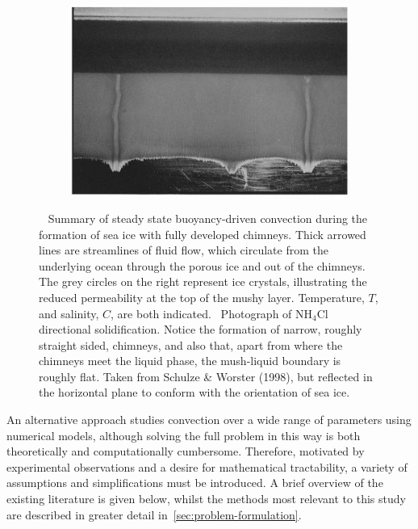 \documentclass[11pt]{proc}
\begin{document}
\begin{figure}[t]
\begin{subfigure}[t]{.55\linewidth}
    \label{subfig:convection-in-sea-ice}
\end{subfigure}
\quad
\captionsetup[subfigure]{ aboveskip=4pt}
\begin{subfigure}[t]{.36\linewidth}
   \centering
   \caption{}
    \includegraphics[width=0.9\linewidth, right]{mushy-layer-chimneys-photo-schulze-worster.jpg}
    
    \label{subfig:schulze-worster-photo}
\end{subfigure}

\caption{~ Summary of steady state buoyancy-driven convection during the formation of sea ice with fully developed chimneys. Thick arrowed lines are streamlines of fluid flow, which circulate from the underlying ocean through the porous ice and out of the chimneys. The grey circles on the right represent ice crystals, illustrating the reduced permeability at the top of the mushy layer. Temperature, $T$, and salinity, $C$, are both indicated.~ Photograph of $\textrm{NH}_4\textrm{Cl}$ directional solidification. Notice the formation of narrow, roughly straight sided, chimneys, and also that, apart from where the chimneys meet the liquid phase, the mush-liquid boundary is roughly flat. Taken from Schulze \& Worster (1998), but reflected in the horizontal plane to conform with the orientation of sea ice.}

\setlength{\belowcaptionskip}{0pt} %

 \label{fig:overview-diagram-photo}

\end{figure}


An alternative approach studies convection over a wide range of parameters using numerical models, although solving the full problem in this way is both theoretically and computationally cumbersome. Therefore, motivated by experimental observations and a desire for mathematical tractability, a variety of assumptions and simplifications must be introduced. A brief overview of the existing literature is given below, whilst the methods most relevant to this study are described in greater detail in~\autoref{sec:problem-formulation}.
\end{document}
